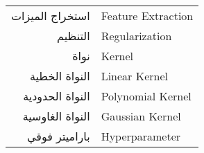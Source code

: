 \begin{doublespacing}
\begin{center}
\begin{tabular}{r l}
			\indent
			استخراج الميزات		& 				\textenglish{Feature Extraction}				\\
			
			\indent
			التنظيم		& 			\textenglish{Regularization}	\\
			
			
			نواة		& 			\textenglish{Kernel}	\\
			
			النواة الخطية		& 			\textenglish{Linear Kernel}		\\
			
			النواة الحدودية		& 			\textenglish{Polynomial Kernel}		\\
			
			النواة الغاوسية		& 			\textenglish{Gaussian Kernel}		\\
			
			باراميتر فوقي		& 			\textenglish{Hyperparameter}		\\
			
		\end{tabular}
	\end{center}
\end{doublespacing}

